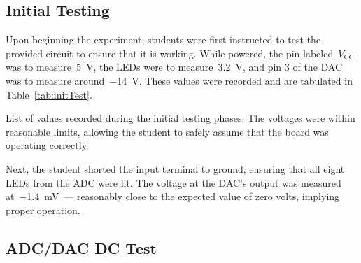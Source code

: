 \subsection{Initial Testing}
Upon beginning the experiment, students were first instructed to test the provided circuit to ensure that it is working.  While powered, the pin labeled~$V_\text{CC}$ was to measure~\SI{5}{\volt}, the LEDs were to measure~\SI{3.2}{\volt}, and pin 3 of the DAC was to measure around~\SI{-14}{\volt}.  These values were recorded and are tabulated in Table~\ref{tab:initTest}.
%
\begin{table}[H]
	\centering
	
	\parbox{.6\textwidth}{
	\caption[Measured Initial Values]{List of values recorded during the initial testing phases.  The voltages were within reasonable limits, allowing the student to safely assume that the board was operating correctly.}
	\label{tab:initTest}}
\end{table}
%
Next, the student shorted the input terminal to ground, ensuring that all eight LEDs from the ADC were lit.  The voltage at the DAC's output was measured at~\SI{-1.4}{\milli\volt}~--- reasonably close to the expected value of zero volts, implying proper operation.

\subsection{ADC/DAC DC Test}

